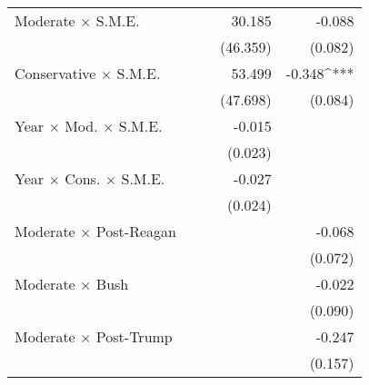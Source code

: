 \begin{center}
\begin{ThreePartTable}
\begin{tabularx}{\textwidth}{X D{.}{.}{2.6} D{.}{.}{2.6} D{.}{.}{3.6} D{.}{.}{2.6}}
Moderate $\times$ S.M.E.            &                             &                             & 30.185                      & -0.088                      \\
                                    &                             &                             & (46.359)                    & (0.082)                     \\
Conservative $\times$ S.M.E.        &                             &                             & 53.499                      & -0.348^{***}                \\
                                    &                             &                             & (47.698)                    & (0.084)                     \\
Year $\times$ Mod. $\times$ S.M.E.  &                             &                             & -0.015                      &                             \\
                                    &                             &                             & (0.023)                     &                             \\
Year $\times$ Cons. $\times$ S.M.E. &                             &                             & -0.027                      &                             \\
                                    &                             &                             & (0.024)                     &                             \\
Moderate $\times$ Post-Reagan       &                             &                             &                             & -0.068                      \\
                                    &                             &                             &                             & (0.072)                     \\
Moderate $\times$ Bush              &                             &                             &                             & -0.022                      \\
                                    &                             &                             &                             & (0.090)                     \\
Moderate $\times$ Post-Trump        &                             &                             &                             & -0.247                      \\
                                    &                             &                             &                             & (0.157)                     \\

\end{tabularx}
\end{ThreePartTable}
\end{center}
